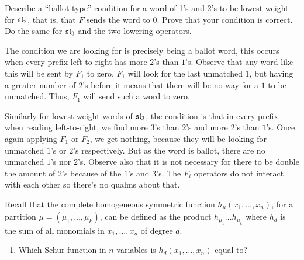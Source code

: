 \documentclass[12pt]{memoir}
\begin{document}
\begin{Ej}
    Describe a ``ballot-type'' condition for a word of 1's and 2's to be lowest weight for $\mathfrak{sl}_2$, that is, that $F$ sends the word to $0$. Prove that your condition is correct. Do the same for $\mathfrak{sl}_3$ and the two lowering operators.
\end{Ej}

\begin{ptcbr}
   The condition we are looking for is precisely being a ballot word, this occurs when every prefix left-to-right has more $2$'s than $1$'s. Observe that any word like this will be sent by $F_1$ to zero. $F_1$ will look for the last unmatched $1$, but having a greater number of $2$'s before it means that there will be no way for a $1$ to be unmatched. Thus, $F_1$ will send such a word to zero.\par
   Similarly for lowest weight words of $\mathfrak{sl}_3$, the condition is that in every prefix when reading left-to-right, we find more $3$'s than $2$'s and more $2$'s than $1$'s. Once again applying $F_1$ or $F_2$, we get nothing, because they will be looking for unmatched $1$'s or $2$'s respectively. But as the word is ballot, there are no unmatched $1$'s nor $2$'s. Observe also that it is not necessary for there to be double the amount of $2$'s because of the $1$'s and $3$'s. The $F_i$ operators do not interact with each other so there's no qualms about that.
\end{ptcbr}

\begin{Ej}
    Recall that the complete homogeneous symmetric function $h_\mu(x_1,\dots,x_n)$, for a partition $\mu=(\mu_1,\dots,\mu_k)$,
can be deﬁned as the product $h_{\mu_1}\dots h_{\mu_k}$ where $h_d$ is the sum of all monomials in $x_1,\dots,x_n$ of degree $d$.
\begin{enumerate}
    \item Which Schur function in $n$ variables is $h_d(x_1,\dots,x_n) $ equal to?
\end{enumerate}
\end{Ej}
\end{document}
